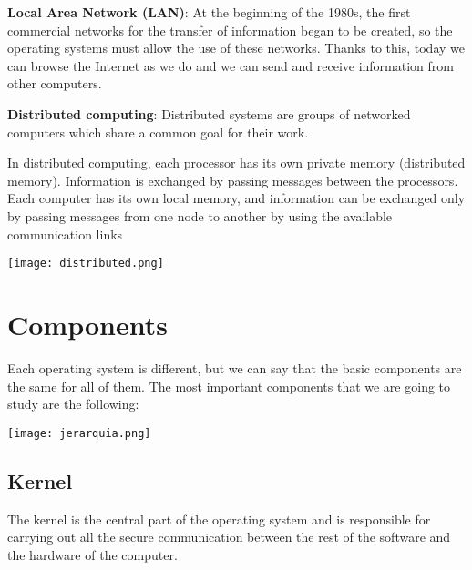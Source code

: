 \begin{itemize}

    \item \textbf{Local Area Network (LAN)}: At the beginning of the 1980s, the first commercial networks for the transfer of information began to be created, so the operating systems must allow the use of these networks. Thanks to this, today we can browse the Internet as we do and we can send and receive information from other computers.

    \begin{minipage}{0.6\linewidth}
        \item \textbf{Distributed computing}: Distributed systems are groups of networked computers which share a common goal for their work.

        In distributed computing, each processor has its own private memory (distributed memory). Information is exchanged by passing messages between the processors. Each computer has its own local memory, and information can be exchanged only by passing messages from one node to another by using the available communication links
    \end{minipage}
    \hfill
    \begin{minipage}{0.34\linewidth}
        \texttt{[image: distributed.png]}
        \vspace{-10pt}
    \end{minipage}
\end{itemize}



\section{Components}

Each operating system is different, but we can say that the basic components are the same for all of them. The most important components that we are going to study are the following:

\begin{center}
    \texttt{[image: jerarquia.png]}
    \vspace{-10pt}
\end{center}



\subsection{Kernel}
The kernel is the central part of the operating system and is responsible for carrying out all the secure communication between the rest of the software and the hardware of the computer.

